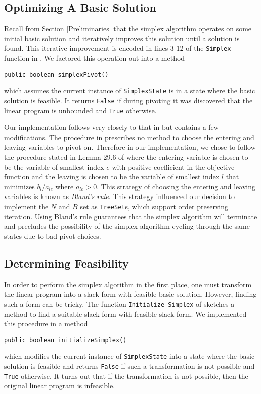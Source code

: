 \documentclass{article}
\newcommand{\javaCode}[1]{\texttt{#1}}
\begin{document}
\subsection{Optimizing A Basic Solution}\label{simplex-pivoting}
Recall from Section \ref{Preliminaries} that the simplex algorithm operates on some initial basic solution and iteratively improves this solution until a solution is found. This iterative improvement is encoded in lines 3-12 of the \javaCode{Simplex} function in \cite{CLRS}. We factored this operation out into a method
\begin{verbatim}
public boolean simplexPivot()
\end{verbatim}
which assumes the current instance of \javaCode{SimplexState} is in a state where the basic solution is feasible. It returns \javaCode{False} if during pivoting it was discovered that the linear program is unbounded and \javaCode{True} otherwise. 

Our implementation follows very closely to that in \cite{CLRS} but contains a few modifications. The procedure in \cite{CLRS} prescribes no method to choose the entering and leaving variables to pivot on. Therefore in our implementation, we chose to follow the procedure stated in Lemma 29.6 of \cite{CLRS} where the entering variable is chosen to be the variable of smallest index $e$ with positive coefficient in the objective function and the leaving is chosen to be the variable of smallest index $l$ that minimizes $b_l / a_{le}$ where $a_{le} > 0$. This strategy of choosing the entering and leaving variables is known as \textit{Bland's rule}. This strategy influenced our decision to implement the $N$ and $B$ set as \javaCode{TreeSet}s, which support order preserving iteration. Using Bland's rule guarantees that the simplex algorithm will terminate and precludes the possibility of the simplex algorithm cycling through the same states due to bad pivot choices. 

\subsection{Determining Feasibility} \label{initialize-simplex}
In order to perform the simplex algorithm in the first place, one must transform the linear program into a slack form with feasible basic solution. However, finding such a form can be tricky. The function \javaCode{Initialize-Simplex} of \cite{CLRS} sketches a method to find a suitable slack form with feasible slack form. We implemented this procedure in a method
\begin{verbatim}
public boolean initializeSimplex()
\end{verbatim}
which modifies the current instance of \javaCode{SimplexState} into a state where the basic solution is feasible and returns \javaCode{False} if such a transformation is not possible and \javaCode{True} otherwise. It turns out that if the transformation is not possible, then the original linear program is infeasible. 
\end{document}
